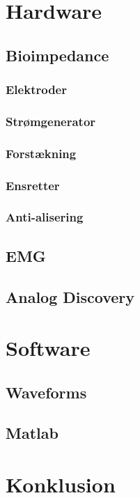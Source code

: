 \documentclass[main.tex]{subfiles}
\begin{document}
\chapter{Hardware}
\section{Bioimpedance}
\subsection{Elektroder}
\subsection{Strømgenerator}
\subsection{Forstækning}
\subsection{Ensretter}
\subsection{Anti-alisering}
\section{EMG}
\section{Analog Discovery}

\chapter{Software}
\section{Waveforms}
\section{Matlab}

\chapter{Konklusion}


\end{document}
